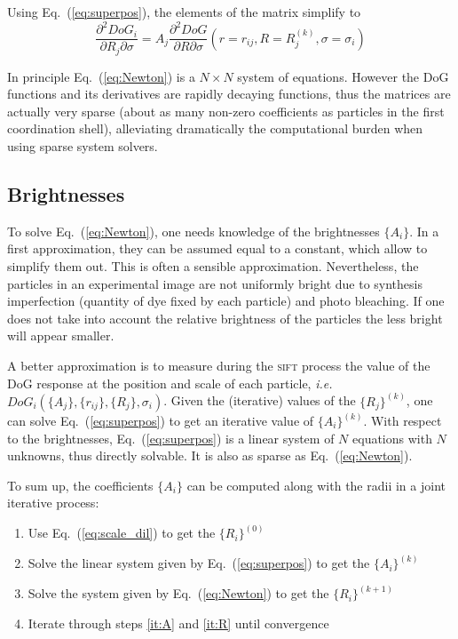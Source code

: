 Using Eq.~(\ref{eq:superpos}), the elements of the matrix simplify to
\begin{equation}
\frac{\partial^2 DoG_i}{\partial R_j\partial\sigma} =  A_j \frac{\partial^2 DoG}{\partial R\partial\sigma}(r=r_{ij}, R=R_j^{(k)}, \sigma=\sigma_i)
\end{equation}

In principle Eq.~(\ref{eq:Newton}) is a $N\times N$ system of equations. However the DoG functions and its derivatives are rapidly decaying functions, thus the matrices are actually very sparse (about as many non-zero coefficients as particles in the first coordination shell), alleviating dramatically the computational burden when using sparse system solvers.

\subsection*{Brightnesses}

To solve Eq.~(\ref{eq:Newton}), one needs knowledge of the brightnesses $\lbrace A_i\rbrace$. In a first approximation, they can be assumed equal to a constant, which allow to simplify them out. This is often a sensible approximation. Nevertheless, the particles in an experimental image are not uniformly bright due to synthesis imperfection (quantity of dye fixed by each particle) and photo bleaching. If one does not take into account the relative brightness of the particles the less bright will appear smaller.

A better approximation is to measure during the \textsc{sift} process the value of the DoG response at the position and scale of each particle, \emph{i.e.} $DoG_i(\lbrace A_j\rbrace, \lbrace r_{ij}\rbrace, \lbrace R_j\rbrace, \sigma_i)$. Given the (iterative) values of the $\lbrace R_j\rbrace^{(k)}$, one can solve Eq.~(\ref{eq:superpos}) to get an iterative value of $\lbrace A_i\rbrace^{(k)}$. With respect to the brightnesses, Eq.~(\ref{eq:superpos}) is a linear system of $N$ equations with $N$ unknowns, thus directly solvable. It is also as sparse as Eq.~(\ref{eq:Newton}).

To sum up, the coefficients $\lbrace A_i\rbrace$ can be computed along with the radii in a joint iterative process:
\begin{enumerate}
\item Use Eq.~(\ref{eq:scale_dil}) to get the $\lbrace R_i\rbrace^{(0)}$
\item Solve the linear system given by Eq.~(\ref{eq:superpos}) to get the $\lbrace A_i\rbrace^{(k)}$ \label{it:A}
\item Solve the system given by Eq.~(\ref{eq:Newton}) to get the $\lbrace R_i\rbrace^{(k+1)}$ \label{it:R}
\item Iterate through steps \ref{it:A} and \ref{it:R} until convergence
\end{enumerate}


